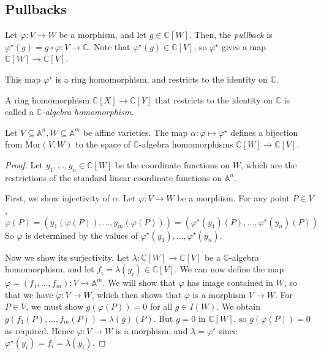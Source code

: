 \subsection{Pullbacks}
\begin{definition}
    Let \( \varphi \colon V \to W \) be a morphism, and let \( g \in \mathbb C[W] \).
    Then, the \emph{pullback} is \( \varphi^\star(g) = g \circ \varphi \colon V \to \mathbb C \).
    Note that \( \varphi^\star(g) \in \mathbb C[V] \), so \( \varphi^\star \) gives a map \( \mathbb C[W] \to \mathbb C[V] \).
\end{definition}
\begin{remark}
    This map \( \varphi^\star \) is a ring homomorphism, and restricts to the identity on \( \mathbb C \).
\end{remark}
\begin{definition}
    A ring homomorphism \( \mathbb C[X] \to \mathbb C[Y] \) that restricts to the identity on \( \mathbb C \) is called a \emph{\( \mathbb C \)-algebra homomorphism}.
\end{definition}
\begin{theorem}
    Let \( V \subseteq \mathbb A^n, W \subseteq \mathbb A^m \) be affine varieties.
    The map \( \alpha \colon \varphi \mapsto \varphi^\star \) defines a bijection from \( \mathrm{Mor}(V, W) \) to the space of \( \mathbb C \)-algebra homomorphisms \( \mathbb C[W] \to \mathbb C[V] \).
\end{theorem}
\begin{proof}
    Let \( y_1, \dots, y_n \in \mathbb C[W] \) be the coordinate functions on \( W \), which are the restrictions of the standard linear coordinate functions on \( \mathbb A^n \).

    First, we show injectivity of \( \alpha \).
    Let \( \varphi \colon V \to W \) be a morphism.
    For any point \( P \in V \),
    \[ \varphi(P) = (y_1(\varphi(P)), \dots, y_m(\varphi(P))) = (\varphi^\star(y_1)(P), \dots, \varphi^\star(y_n)(P)) \]
    So \( \varphi \) is determined by the values of \( \varphi^\star(y_1), \dots, \varphi^\star(y_n) \).

    Now we show its surjectivity.
    Let \( \lambda \colon \mathbb C[W] \to \mathbb C[V] \) be a \( \mathbb C \)-algebra homomorphism, and let \( f_i = \lambda(y_i) \in \mathbb C[V] \).
    We can now define the map \( \varphi = (f_1, \dots, f_m) \colon V \to \mathbb A^m \).
    We will show that \( \varphi \) has image contained in \( W \), so that we have \( \varphi \colon V \to W \), which then shows that \( \varphi \) is a morphism \( V \to W \).
    For \( P \in V \), we must show \( g(\varphi(P)) = 0 \) for all \( g \in I(W) \).
    We obtain \( g(f_1(P), \dots, f_m(P)) = \lambda(g)(P) \).
    But \( g = 0 \) in \( \mathbb C[W] \), so \( g(\varphi(P)) = 0 \) as required.
    Hence \( \varphi \colon V \to W \) is a morphism, and \( \lambda = \varphi^\star \) since \( \varphi^\star(y_i) = f_i = \lambda(y_i) \).
\end{proof}
